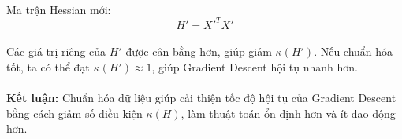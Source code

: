 \paragraph{}{Ma trận Hessian mới:}
\[
H' = X'^T X'
\]
\paragraph{}{Các giá trị riêng của \( H' \) được cân bằng hơn, giúp giảm \( \kappa(H') \). Nếu chuẩn hóa tốt, ta có thể đạt \( \kappa(H') \approx 1 \), giúp Gradient Descent hội tụ nhanh hơn.}

\paragraph{}{\textbf{Kết luận:} Chuẩn hóa dữ liệu giúp cải thiện tốc độ hội tụ của Gradient Descent bằng cách giảm số điều kiện \( \kappa(H) \), làm thuật toán ổn định hơn và ít dao động hơn.}

